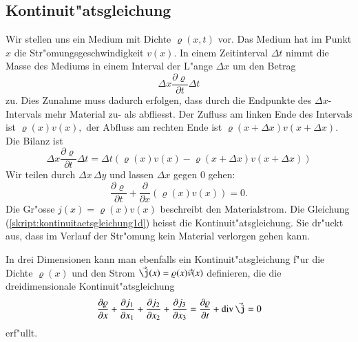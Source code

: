 \subsection{Kontinuit"atsgleichung}
Wir stellen uns ein Medium mit Dichte $\varrho(x,t)$ vor.
Das Medium hat im Punkt $x$ die Str"omungsgeschwindigkeit $v(x)$.
In einem Zeitinterval $\Delta t$ nimmt die Masse des Mediums
in einem Interval der L"ange $\Delta x$ um den Betrag
\[
\Delta x\frac{\partial\varrho}{\partial t}\Delta t
\]
zu.
Dies Zunahme muss dadurch erfolgen, dass durch die Endpunkte
des $\Delta x$-Intervals mehr Material zu- als abfliesst.
Der Zufluss am linken Ende des Intervals ist
$
\varrho(x) v(x),
$
der Abfluss am rechten Ende ist $\varrho(x+\Delta x)v(x+\Delta x)$.
Die Bilanz ist
\[
\Delta x\frac{\partial\varrho}{\partial t}\Delta t
=
\Delta t(
\varrho(x) v(x)
-
\varrho(x+\Delta x) v(x+\Delta x)
)
\]
Wir teilen durch $\Delta x\,\Delta y$ und lassen $\Delta x$ gegen 0 gehen:
\begin{equation}
\frac{\partial\varrho}{\partial t}
+\frac{\partial}{\partial x}(\varrho(x)v(x))
=0.
\label{skript:kontinuitaetsgleichung1d}
\end{equation}
Die Gr"osse $j(x)=\varrho(x)v(x)$ beschreibt den Materialstrom.
Die Gleichung (\ref{skript:kontinuitaetsgleichung1d}) heisst die
Kontinuit"atsgleichung.
Sie dr"uckt aus, dass im Verlauf der Str"omung kein Material verlorgen
gehen kann.

In drei Dimensionen kann man ebenfalls ein Kontinuit"atsgleichung
f"ur die Dichte $\varrho(x)$ und den Strom $\vec\j(x)=\varrho(x) \vec v(x)$
definieren, die die dreidimensionale 
Kontinuit"atsgleichung
\[
\frac{\partial\varrho}{\partial x}
+
\frac{\partial j_1}{\partial x_1}
+
\frac{\partial j_2}{\partial x_2}
+
\frac{\partial j_3}{\partial x_3}
=
\frac{\partial\varrho}{\partial t}+\operatorname{div}\vec\j
=0
\]
erf"ullt.

